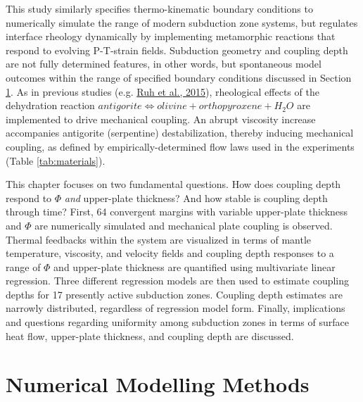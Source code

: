 This study similarly specifies thermo-kinematic boundary conditions to numerically simulate the range of modern subduction zone systems, but regulates interface rheology dynamically by implementing metamorphic reactions that respond to evolving P-T-strain fields. Subduction geometry and coupling depth are not fully determined features, in other words, but spontaneous model outcomes within the range of specified boundary conditions discussed in Section \ref{numMethods}. As in previous studies (e.g. \protect\hyperlink{ref-ruh2015}{Ruh et al., 2015}), rheological effects of the dehydration reaction \(antigorite \allowbreak \Leftrightarrow olivine + orthopyroxene + H_{2}O\) are implemented to drive mechanical coupling. An abrupt viscosity increase accompanies antigorite (serpentine) destabilization, thereby inducing mechanical coupling, as defined by empirically-determined flow laws used in the experiments (Table \ref{tab:materials}).

This chapter focuses on two fundamental questions. How does coupling depth respond to \(\Phi\) \emph{and} upper-plate thickness? And how stable is coupling depth through time? First, 64 convergent margins with variable upper-plate thickness and \(\Phi\) are numerically simulated and mechanical plate coupling is observed. Thermal feedbacks within the system are visualized in terms of mantle temperature, viscosity, and velocity fields and coupling depth responses to a range of \(\Phi\) and upper-plate thickness are quantified using multivariate linear regression. Three different regression models are then used to estimate coupling depths for 17 presently active subduction zones. Coupling depth estimates are narrowly distributed, regardless of regression model form. Finally, implications and questions regarding uniformity among subduction zones in terms of surface heat flow, upper-plate thickness, and coupling depth are discussed.

\hypertarget{numMethods}{%
\section{Numerical Modelling Methods}\label{numMethods}}

